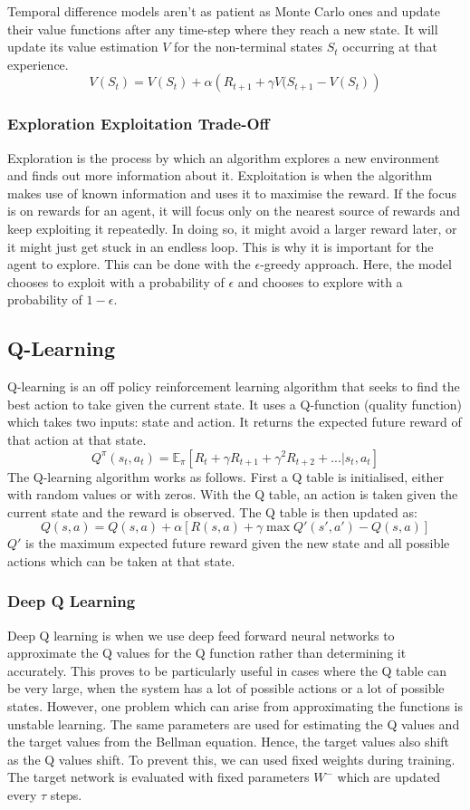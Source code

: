 \documentclass{article}
\begin{document}
Temporal difference models aren't as patient as Monte Carlo ones and update their value functions after any time-step where they reach a new state. It will update its value estimation $V$ for the non-terminal states $S_t$ occurring at that experience.
$$V(S_t) = V(S_t) + \alpha\left(R_{t+1} + \gamma V(S_{t+1} - V(S_t)\right)$$

\subsubsection{Exploration Exploitation Trade-Off}
Exploration is the process by which an algorithm explores a new environment and finds out more information about it. Exploitation is when the algorithm makes use of known information and uses it to maximise the reward. If the focus is on rewards for an agent, it will focus only on the nearest source of rewards and keep exploiting it repeatedly. In doing so, it might avoid a larger reward later, or it might just get stuck in an endless loop. This is why it is important for the agent to explore. This can be done with the $\epsilon$-greedy approach. Here, the model chooses to exploit with a probability of $\epsilon$ and chooses to explore with a probability of $1-\epsilon$.

\subsection{Q-Learning}
Q-learning is an off policy reinforcement learning algorithm that seeks to find the best action to take given the current state. It uses a Q-function (quality function) which takes two inputs: state and action. It returns the expected future reward of that action at that state.
$$Q^{\pi}(s_t, a_t) = \mathbb{E}_{\pi}[R_t + \gamma R_{t+1} + \gamma^2 R_{t+2} + ... |s_t, a_t]$$
The Q-learning algorithm works as follows. First a Q table is initialised, either with random values or with zeros. With the Q table, an action is taken given the current state and the reward is observed. The Q table is then updated as:
$$Q(s, a) = Q(s, a) + \alpha \left[R(s, a) + \gamma \max Q'(s', a') - Q(s, a) \right]$$
$Q'$ is the maximum expected future reward given the new state and all possible actions which can be taken at that state.

\subsubsection{Deep Q Learning}
Deep Q learning is when we use deep feed forward neural networks to approximate the Q values for the Q function rather than determining it accurately. This proves to be particularly useful in cases where the Q table can be very large, when the system has a lot of possible actions or a lot of possible states. However, one problem which can arise from approximating the functions is unstable learning. The same parameters are used for estimating the Q values and the target values from the Bellman equation. Hence, the target values also shift as the Q values shift. To prevent this, we can used fixed weights during training. The target network is evaluated with fixed parameters $W^-$ which are updated every $\tau$ steps.
\end{document}
